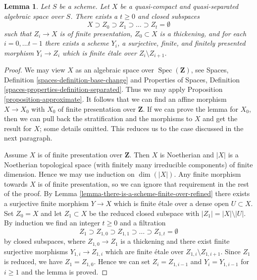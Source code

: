 \documentclass{stacks-project}
\theoremstyle{plain}
\newtheorem{lemma}[subsection]{Lemma}
\theoremstyle{definition}
\theoremstyle{remark}
\numberwithin{equation}{subsection}
\def\Spec{\mathop{\mathrm{Spec}}}
\begin{document}
\begin{lemma}
\label{lemma-there-is-a-scheme-finite-over-filtered}
Let $S$ be a scheme. Let $X$ be a quasi-compact and quasi-separated
algebraic space over $S$. There exists a $t \geq 0$ and closed
subspaces
$$
X \supset Z_0 \supset Z_1 \supset \ldots \supset Z_t = \emptyset
$$
such that $Z_i \to X$ is of finite presentation,
$Z_0 \subset X$ is a thickening, and for each $i = 0, \ldots t - 1$
there exists a scheme $Y_i$, a surjective, finite, and finitely
presented morphism $Y_i \to Z_i$ which is finite \'etale over
$Z_i \setminus Z_{i + 1}$.
\end{lemma}

\begin{proof}
We may view $X$ as an algebraic space over $\Spec(\mathbf{Z})$, see
Spaces, Definition \ref{spaces-definition-base-change} and
Properties of Spaces, Definition \ref{spaces-properties-definition-separated}.
Thus we may apply Proposition \ref{proposition-approximate}.
It follows that we can find an affine morphism $X \to X_0$
with $X_0$ of finite presentation over $\mathbf{Z}$.
If we can prove the lemma for $X_0$, then we can pull back
the stratification and the morphisms to $X$ and get the result for $X$;
some details omitted. This reduces us to the case discussed in the
next paragraph.

\medskip\noindent
Assume $X$ is of finite presentation over $\mathbf{Z}$.
Then $X$ is Noetherian and $|X|$ is a Noetherian topological
space (with finitely many irreducible components) of finite dimension.
Hence we may use induction on $\dim(|X|)$.
Any finite morphism towards $X$ is of finite presentation, so
we can ignore that requirement in the rest of the proof.
By Lemma \ref{lemma-there-is-a-scheme-finite-over-refined}
there exists a surjective finite morphism $Y \to X$ which is
finite \'etale over a dense open $U \subset X$.
Set $Z_0 = X$ and let $Z_1 \subset X$ be the reduced closed subspace
with $|Z_1| = |X| \setminus |U|$.
By induction we find an integer $t \geq 0$ and a filtration
$$
Z_1 \supset Z_{1, 0} \supset Z_{1, 1} \supset \ldots
\supset Z_{1, t} = \emptyset
$$
by closed subspaces, where $Z_{1, 0} \to Z_1$ is a thickening
and there exist finite surjective morphisms $Y_{1, i} \to Z_{1, i}$
which are finite \'etale over $Z_{1, i} \setminus Z_{1, i + 1}$.
Since $Z_1$ is reduced, we have $Z_1 = Z_{1, 0}$.
Hence we can set $Z_i = Z_{1, i - 1}$ and $Y_i = Y_{1, i - 1}$
for $i \geq 1$ and the lemma is proved.
\end{proof}
\end{document}
